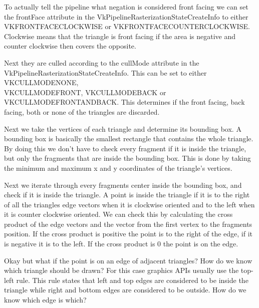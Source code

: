 \documentclass[12pt]{report} \usepackage{preamble}
\begin{document}
To actually tell the pipeline what negation is considered front facing
we can set the frontFace attribute in the VkPipelineRasterizationStateCreateInfo
to either \\
VK\textunderscore FRONT\textunderscore FACE\textunderscore CLOCKWISE or
VK\textunderscore FRONT\textunderscore FACE\textunderscore COUNTER\textunderscore CLOCKWISE.
Clockwise means that the triangle is front facing if the area is negative
and counter clockwise then covers the opposite. \cite{rasterization}

Next they are culled according to the cullMode attribute
in the VkPipelineRasterizationStateCreateInfo. This can be set to either
VK\textunderscore CULL\textunderscore MODE\textunderscore NONE, \\
VK\textunderscore CULL\textunderscore MODE\textunderscore FRONT,
VK\textunderscore CULL\textunderscore MODE\textunderscore BACK or \\
VK\textunderscore CULL\textunderscore MODE\textunderscore FRONT\textunderscore AND\textunderscore BACK.
This determines if the front facing, back facing,
both or none of the triangles are discarded. \cite{rasterization}

Next we take the vertices of each triangle and determine its bounding box.
A bounding box is basically the smallest rectangle that
contains the whole triangle. By doing this we don't have to check every fragment
if it is inside the triangle, but only the fragments that are
inside the bounding box. This is done by taking the minimum
and maximum x and y coordinates of the triangle's vertices.

Next we iterate through every fragments center inside the bounding box,
and check if it is inside the triangle.
A point is inside the triangle if it is to the right of all
the triangles edge vectors when it is clockwise oriented
and to the left when it is counter clockwise oriented.
We can check this by calculating the cross product of the edge vectors and the vector
from the first vertex to the fragments position. If the cross product is positive
the point is to the right of the edge, if it is negative it is to the left.
If the cross product is 0 the point is on the edge.

Okay but what if the point is on an edge of adjacent triangles?
How do we know which triangle should be drawn?
For this case graphics APIs usually use the top-left rule.
This rule states that left and top edges are considered to be inside the triangle
while right and bottom edges are considered to be outside. How do we know which edge is which?
\end{document}
